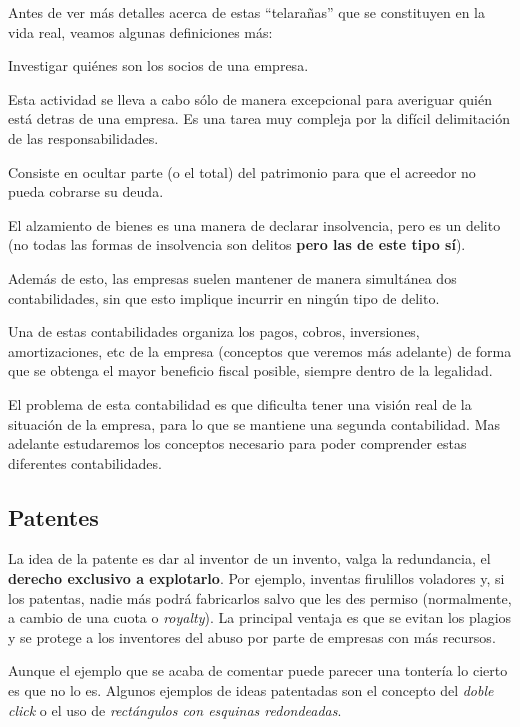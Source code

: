 \documentclass[nochap,palatino,shortheader]{apuntes}
\begin{document}
Antes de ver más detalles acerca de estas ``telarañas'' que se constituyen en la vida real, veamos algunas definiciones más:

\begin{defn}
Investigar quiénes son los socios de una empresa.

Esta actividad se lleva a cabo sólo de manera excepcional para averiguar quién está detras de una empresa. Es una tarea muy compleja por la difícil delimitación de las responsabilidades.
\end{defn}

\begin{defn}
Consiste en ocultar parte (o el total) del patrimonio para que el acreedor no pueda cobrarse su deuda.

El alzamiento de bienes es una manera de declarar insolvencia, pero es un delito (no todas las formas de insolvencia son delitos \textbf{pero las de este tipo sí}).
\end{defn}

Además de esto, las empresas suelen mantener de manera simultánea dos contabilidades, sin que esto implique incurrir en ningún tipo de delito.

Una de estas contabilidades organiza los pagos, cobros, inversiones, amortizaciones, etc de la empresa (conceptos que veremos más adelante) de forma que se obtenga el mayor beneficio fiscal posible, siempre dentro de la legalidad.

El problema de esta contabilidad es que dificulta tener una visión real de la situación de la empresa, para lo que se mantiene una segunda contabilidad. Mas adelante estudaremos los conceptos necesario para poder comprender estas diferentes contabilidades.


\subsection{Patentes}

La idea de la patente es dar al inventor de un invento, valga la redundancia, el \textbf{derecho exclusivo a explotarlo}. Por ejemplo, inventas firulillos voladores y, si los patentas, nadie más podrá fabricarlos salvo que les des permiso (normalmente, a cambio de una cuota o \textit{royalty}). La principal ventaja es que se evitan los plagios y se protege a los inventores del abuso por parte de empresas con más recursos.

Aunque el ejemplo que se acaba de comentar puede parecer una tontería lo cierto es que no lo es. Algunos ejemplos de ideas patentadas son el concepto del \textit{doble click} o el uso de \textit{rectángulos con esquinas redondeadas}.
\end{document}
